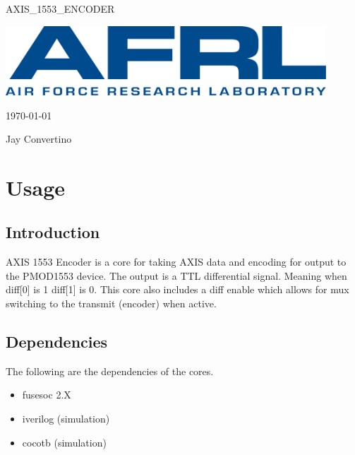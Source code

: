 \begin{titlepage}
  \begin{center}

  {\Huge AXIS\_1553\_ENCODER}

  \vspace{25mm}

  \includegraphics[width=0.90\textwidth,height=\textheight,keepaspectratio]{img/AFRL.png}

  \vspace{25mm}

  \today

  \vspace{15mm}

  {\Large Jay Convertino}

  \end{center}
\end{titlepage}

\tableofcontents

\newpage

\section{Usage}

\subsection{Introduction}

\par
AXIS 1553 Encoder is a core for taking AXIS data and encoding for output to the PMOD1553 device. The output
is a TTL differential signal. Meaning when diff[0] is 1 diff[1] is 0. This core also includes a diff enable
which allows for mux switching to the transmit (encoder) when active.

\subsection{Dependencies}

\par
The following are the dependencies of the cores.

\begin{itemize}
  \item fusesoc 2.X
  \item iverilog (simulation)
  \item cocotb (simulation)
\end{itemize}

